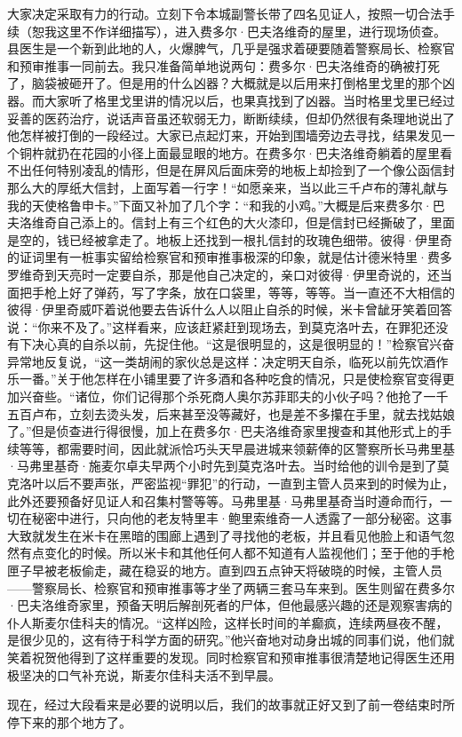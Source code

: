 \par 大家决定采取有力的行动。立刻下令本城副警长带了四名见证人，按照一切合法手续（恕我这里不作详细描写），进入费多尔·巴夫洛维奇的屋里，进行现场侦查。县医生是一个新到此地的人，火爆脾气，几乎是强求着硬要随着警察局长、检察官和预审推事一同前去。我只准备简单地说两句：费多尔·巴夫洛维奇的确被打死了，脑袋被砸开了。但是用的什么凶器？大概就是以后用来打倒格里戈里的那个凶器。而大家听了格里戈里讲的情况以后，也果真找到了凶器。当时格里戈里已经过妥善的医药治疗，说话声音虽还软弱无力，断断续续，但却仍然很有条理地说出了他怎样被打倒的一段经过。大家已点起灯来，开始到围墙旁边去寻找，结果发见一个铜杵就扔在花园的小径上面最显眼的地方。在费多尔·巴夫洛维奇躺着的屋里看不出任何特别凌乱的情形，但是在屏风后面床旁的地板上却捡到了一个像公函信封那么大的厚纸大信封，上面写着一行字！“如愿亲来，当以此三千卢布的薄礼献与我的天使格鲁申卡。”下面又补加了几个字：“和我的小鸡。”大概是后来费多尔·巴夫洛维奇自己添上的。信封上有三个红色的大火漆印，但是信封已经撕破了，里面是空的，钱已经被拿走了。地板上还找到一根扎信封的玫瑰色细带。彼得·伊里奇的证词里有一桩事实留给检察官和预审推事极深的印象，就是估计德米特里·费多罗维奇到天亮时一定要自杀，那是他自己决定的，亲口对彼得·伊里奇说的，还当面把手枪上好了弹药，写了字条，放在口袋里，等等，等等。当一直还不大相信的彼得·伊里奇威吓着说他要去告诉什么人以阻止自杀的时候，米卡曾龇牙笑着回答说：“你来不及了。”这样看来，应该赶紧赶到现场去，到莫克洛叶去，在罪犯还没有下决心真的自杀以前，先捉住他。“这是很明显的，这是很明显的！”检察官兴奋异常地反复说，“这一类胡闹的家伙总是这样：决定明天自杀，临死以前先饮酒作乐一番。”关于他怎样在小铺里要了许多酒和各种吃食的情况，只是使检察官变得更加兴奋些。“诸位，你们记得那个杀死商人奥尔苏菲耶夫的小伙子吗？他抢了一千五百卢布，立刻去烫头发，后来甚至没等藏好，也是差不多攥在手里，就去找姑娘了。”但是侦查进行得很慢，加上在费多尔·巴夫洛维奇家里搜查和其他形式上的手续等等，都需要时间，因此就派恰巧头天早晨进城来领薪俸的区警察所长马弗里基·马弗里基奇·施麦尔卓夫早两个小时先到莫克洛叶去。当时给他的训令是到了莫克洛叶以后不要声张，严密监视“罪犯”的行动，一直到主管人员来到的时候为止，此外还要预备好见证人和召集村警等等。马弗里基·马弗里基奇当时遵命而行，一切在秘密中进行，只向他的老友特里丰·鲍里索维奇一人透露了一部分秘密。这事大致就发生在米卡在黑暗的围廊上遇到了寻找他的老板，并且看见他脸上和语气忽然有点变化的时候。所以米卡和其他任何人都不知道有人监视他们；至于他的手枪匣子早被老板偷走，藏在稳妥的地方。直到四五点钟天将破晓的时候，主管人员——警察局长、检察官和预审推事等才坐了两辆三套马车来到。医生则留在费多尔·巴夫洛维奇家里，预备天明后解剖死者的尸体，但他最感兴趣的还是观察害病的仆人斯麦尔佳科夫的情况。“这样凶险，这样长时间的羊癫疯，连续两昼夜不醒，是很少见的，这有待于科学方面的研究。”他兴奋地对动身出城的同事们说，他们就笑着祝贺他得到了这样重要的发现。同时检察官和预审推事很清楚地记得医生还用极坚决的口气补充说，斯麦尔佳科夫活不到早晨。
\par 现在，经过大段看来是必要的说明以后，我们的故事就正好又到了前一卷结束时所停下来的那个地方了。

